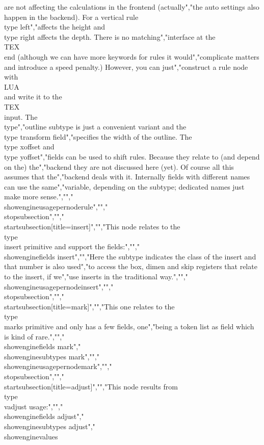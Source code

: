 are not affecting the calculations in the frontend (actually","the auto settings also happen in the backend). For a vertical rule \\type {left}","affects the height and \\type {right} affects the depth. There is no matching","interface at the \\TEX\\ end (although we can have more keywords for rules it would","complicate matters and introduce a speed penalty.) However, you can just","construct a rule node with \\LUA\\ and write it to the \\TEX\\ input. The \\type","{outline} subtype is just a convenient variant and the \\type {transform} field","specifies the width of the outline. The \\type {xoffset} and \\type {yoffset}","fields can be used to shift rules. Because they relate to (and depend on the) the","backend they are not discussed here (yet). Of course all this assumes that the","backend deals with it. Internally fields with different names can use the same","variable, depending on the subtype; dedicated names just make more sense.","","\\showengineusagepernode{rule}","","\\stopsubsection","","\\startsubsection[title={insert}]","","This node relates to the \\type {\\insert} primitive and support the fields:","","\\showenginefields {insert}","","Here the subtype indicates the class of the insert and that number is also used","to access the box, dimen and skip registers that relate to the insert, if we","use inserts in the traditional way.","","\\showengineusagepernode{insert}","","\\stopsubsection","","\\startsubsection[title={mark}]","","This one relates to the \\type {\\marks} primitive and only has a few fields, one","being a token list as field which is kind of rare.","","\\showenginefields   {mark}","\\showenginesubtypes {mark}","","\\showengineusagepernode{mark}","","\\stopsubsection","","\\startsubsection[title={adjust}]","","This node results from \\type {\\vadjust} usage:","","\\showenginefields   {adjust}","\\showenginesubtypes {adjust}","\\showenginevalues   